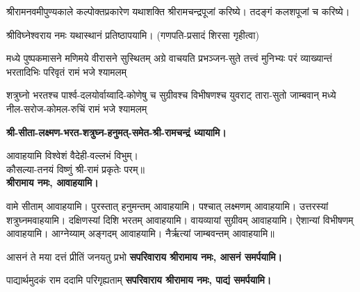 श्रीरामनवमीपुण्यकाले कल्पोक्तप्रकारेण यथाशक्ति श्रीरामचन्द्रपूजां
करिष्ये।
तदङ्गं कलशपूजां च करिष्ये।

श्रीविघ्नेश्वराय नमः यथास्थानं प्रतिष्ठापयामि।
(गणपति-प्रसादं शिरसा गृहीत्वा)













\begin{center}

\renewcommand{\devAya}{सपरिवाराय श्रीरामाय नमः,}

{मध्ये पुष्पकमासने मणिमये वीरासने सुस्थितम्}
{अग्रे वाचयति प्रभञ्जन-सुते तत्त्वं मुनिभ्यः परं}
{व्याख्यान्तं भरतादिभिः परिवृतं रामं भजे श्यामलम्}

{शत्रुघ्नो भरतश्च पार्श्व-दलयोर्वाय्वादि-कोणेषु च}
{सुग्रीवश्च विभीषणश्च युवराट् तारा-सुतो जाम्बवान्}
{मध्ये नील-सरोज-कोमल-रुचिं रामं भजे श्यामलम्}

\textbf{श्री-सीता-लक्ष्मण-भरत-शत्रुघ्न-हनुमत्-समेत-श्री-रामचन्द्रं ध्यायामि।}



आवाहयामि विश्वेशं वैदेही-वल्लभं विभुम्।\\
कौसल्या-तनयं विष्णुं श्री-रामं प्रकृतेः परम्॥\\
\textbf{श्रीरामाय नमः, आवाहयामि।}

वामे सीताम् आवाहयामि।
पुरस्तात् हनुमन्तम् आवाहयामि।
पश्चात् लक्ष्मणम् आवाहयामि।
उत्तरस्यां शत्रुघ्नमवाहयामि।
दक्षिणस्यां दिशि भरतम् आवाहयामि।
वायव्यायां सुग्रीवम् आवाहयामि।
ऐशान्यां विभीषणम् आवाहयामि।
आग्नेय्याम् अङ्गदम् आवाहयामि।
नैर्ऋत्यां जाम्बवन्तम् आवाहयामि॥

\aavaahitobhava

{आसनं ते मया दत्तं प्रीतिं जनयतु प्रभो}
\textbf{\devAya{} आसनं समर्पयामि।\\}

{पाद्यार्थमुदकं राम ददामि परिगृह्यताम्}
\textbf{\devAya{} पाद्यं समर्पयामि।\\}


\end{center}
